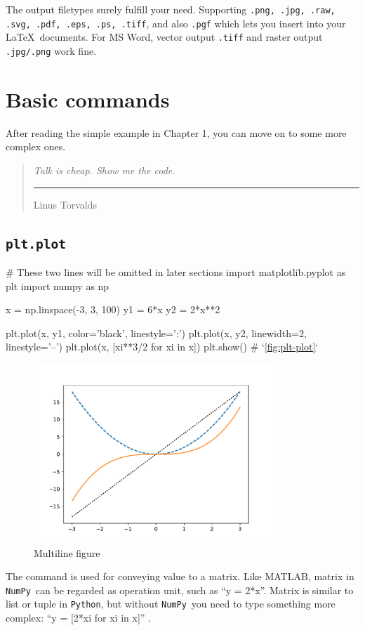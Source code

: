 \documentclass{report}
\newcommand{\pkg}[1]{\texttt{#1}}
\newcommand{\Py}{\pkg{Python}}
\newcommand{\NumPy}{\pkg{NumPy}}
\newcommand{\smallquote}[3][0.8ex]{\begin{quote}
    \flushright\emph{#2}\\[#1]
    \ttfamily\rule[0.5ex]{2em}{0.8pt} #3\end{quote}}
\begin{document}
The output filetypes surely fulfill your need. Supporting \texttt{.png, .jpg, .raw, .svg, .pdf, .eps, .ps, .tiff}, and also \texttt{.pgf} which lets you insert into your \LaTeX\ documents. For MS Word, vector output \texttt{.tiff} and raster output \texttt{.jpg/.png} work fine.

\chapter{Basic commands}
After reading the simple example in Chapter 1, you can move on to some more complex ones. 

\smallquote{Talk is cheap. Show me the code.}{Linus Torvalds}

\section{\texttt{plt.plot}}

\begin{py}
# These two lines will be omitted in later sections
import matplotlib.pyplot as plt
import numpy as np

x = np.linspace(-3, 3, 100)
y1 = 6*x
y2 = 2*x**2

plt.plot(x, y1, color='black', linestyle=':')
plt.plot(x, y2, linewidth=2, linestyle='--')
plt.plot(x, [xi**3/2 for xi in x])
plt.show() # `\autoref{fig:plt-plot}`
\end{py}

\begin{figure}[!htb]
  \centering
  \includegraphics[width=90mm]{plt-plot}
  \caption{Multiline figure}
  \label{fig:plt-plot}
\end{figure}

The command  is used for conveying value to a matrix. Like MATLAB, matrix in \NumPy\ can be regarded as operation unit, such as ``y = 2*x''. Matrix is similar to list or tuple in \Py , but without \NumPy\ you need to type something more complex: ``y = [2*xi for xi in x]'' .
\end{document}
